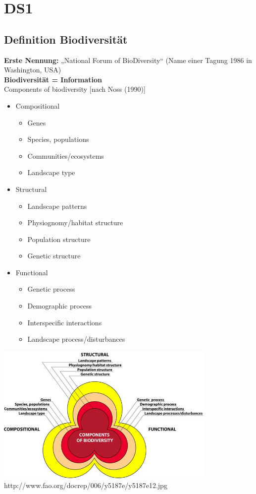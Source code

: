 \section{DS1}
\subsection{Definition Biodiversität}
\textbf{Erste Nennung:} „National Forum of BioDiversity“ (Name einer Tagung 1986 in Washington, USA)\\
\textbf{Biodiversität = Information}\\
Components of biodiversity [nach Noss (1990)]
\begin{itemize}
	\item Compositional
	\begin{itemize}
		\item Genes
		\item Species, populations
		\item Communities/ecosystems
		\item Landscape type
	\end{itemize}
	\item Structural
	\begin{itemize}
		\item Landscape patterns
		\item Physiognomy/habitat structure
		\item Population structure
		\item Genetic structure
	\end{itemize}
	\item Functional
	\begin{itemize}
		\item Genetic process
		\item Demographic process
		\item Interspecific interactions
		\item Landscape process/disturbances
	\end{itemize}
\end{itemize}

\includegraphics[width=0.8\textwidth]{lectures/DS1/pix/y5187e12.jpg}\\
http://www.fao.org/docrep/006/y5187e/y5187e12.jpg

